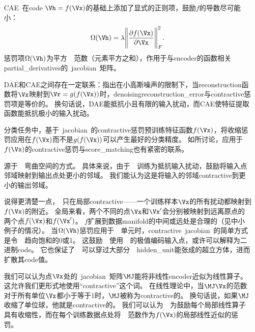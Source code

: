 
\section{}
\label{sec:contractive_autoencoders}
\gls{CAE}~\citep{Rifai+al-2011-small,Salah+al-2011-small}在\gls{code} $\Vh = f(\Vx)$的基础上添加了显式的正则项，鼓励$f$的导数尽可能小：
\begin{align}
 \Omega(\Vh) = \lambda \Bigg\| \frac{\partial f(\Vx)}{\partial \Vx} \Bigg\|_F^2 .
\end{align}
惩罚项$\Omega(\Vh)$为平方~~范数（元素平方之和），作用于与\gls{encoder}的函数相关\gls{partial_derivatives}的~\gls{jacobian}~矩阵。


\gls{DAE}和\gls{CAE}之间存在一定联系：\citet{Alain+Bengio-ICLR2013-small}指出在小高斯噪声的限制下，当\gls{reconstruction}函数将$\Vx$映射到$\Vr = g(f(\Vx))$时，\gls{denoising}\gls{reconstruction_error}与\gls{contractive}惩罚项是等价的。
换句话说，\gls{DAE}能抵抗小且有限的输入扰动，而\gls{CAE}使特征提取函数能抵抗极小的输入扰动。

分类任务中，基于~\gls{jacobian}~的\gls{contractive}惩罚预训练特征函数$f(\Vx)$，将收缩惩罚应用在$f(\Vx)$而不是$g(f(\Vx))$可以产生最好的分类精度。
如所讨论，应用于$f(\Vx)$的\gls{contractive}惩罚与\gls{score_matching}也有紧密的联系。

源于~~弯曲空间的方式。
具体来说，由于~~训练为抵抗输入扰动，鼓励将输入点邻域映射到输出点处更小的邻域。
我们能认为这是将输入的邻域\gls{contractive}到更小的输出邻域。


说得更清楚一点，~只在局部\gls{contractive}——一个训练样本$\Vx$的所有扰动都映射到$f(\Vx)$的附近。
全局来看，两个不同的点$\Vx$和$\Vx'$会分别被映射到远离原点的两个点$f(\Vx)$和$f(\Vx')$。
$f$扩展到数据\gls{manifold}的中间或远处是合理的（见中小例子的情况）。
当$\Omega(\Vh)$惩罚应用于~~单元时，\gls{contractive}~\gls{jacobian}~的简单方式是令~~趋向饱和的0或1。
这鼓励~~使用~~的极值编码输入点，或许可以解释为二进制\gls{code}。
它也保证了~~可以穿过大部分~~\gls{hidden_unit}能张成的超立方体，进而扩散其\gls{code}值。

我们可以认为点$\Vx$处的~\gls{jacobian}~矩阵$\MJ$能将非线性\gls{encoder}近似为线性算子。
这允许我们更形式地使用``\gls{contractive}''这个词。
在线性理论中，当$\MJ\Vx$的范数对于所有单位$\Vx$都小于等于1时，$\MJ$被称为\gls{contractive}的。
换句话说，如果$\MJ$收缩了单位球，他就是\gls{contractive}的。
我们可以认为~~为鼓励每个局部线性算子具有收缩性，而在每个训练数据点处将~~范数作为$f(\Vx)$的局部线性近似的惩罚。


